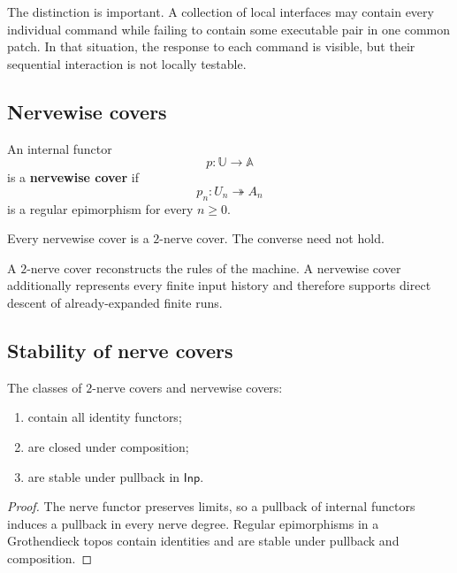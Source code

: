 The distinction is important. A collection of local interfaces may contain
every individual command while failing to contain some executable pair in one
common patch. In that situation, the response to each command is visible, but
their sequential interaction is not locally testable.

\subsection{Nervewise covers}
\label{subsec:nervewise-covers}

\begin{definition}
\label{def:nervewise-interface-cover}
An internal functor
\[
    p:\mathbb U\to\mathbb A
\]
is a \textbf{nervewise cover} if
\[
    p_n:U_n\twoheadrightarrow A_n
\]
is a regular epimorphism for every \(n\geq0\).
\end{definition}

Every nervewise cover is a \(2\)-nerve cover. The converse need not hold.

A \(2\)-nerve cover reconstructs the rules of the machine. A nervewise cover
additionally represents every finite input history and therefore supports
direct descent of already-expanded finite runs.

\subsection{Stability of nerve covers}
\label{subsec:stability-nerve-covers}

\begin{proposition}
\label{prop:stability-nerve-covers}
The classes of \(2\)-nerve covers and nervewise covers:
\begin{enumerate}
    \item contain all identity functors;
    \item are closed under composition;
    \item are stable under pullback in \(\mathsf{Inp}\).
\end{enumerate}
\end{proposition}

\begin{proof}
The nerve functor preserves limits, so a pullback of internal functors induces
a pullback in every nerve degree. Regular epimorphisms in a Grothendieck topos
contain identities and are stable under pullback and composition.
\end{proof}

